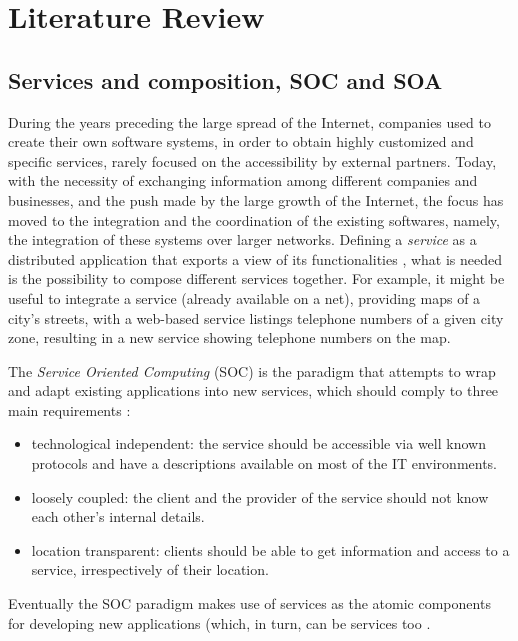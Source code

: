 \section{Literature Review}
\label{LiteratureReview}

\subsection{Services and composition, SOC and SOA}
\label{SOC&SOA}
During the years preceding the large spread of the Internet, companies used to create their own software systems, in order to obtain highly customized and specific services, rarely focused on the accessibility by external partners.
Today, with the necessity of exchanging information among different companies and businesses, and the push made by the large growth of the Internet, the focus has moved to the integration and the coordination of the existing softwares, namely, the integration of these systems over larger networks.
Defining a \textit{service} as a distributed application that exports a view of its functionalities  \cite{DiLorenzo08}, what is needed is the possibility to compose different services together.
For example, it might be useful to integrate a service (already available on a net), providing maps of a city's streets, with a web-based service listings telephone numbers of a given city zone, resulting in a new service showing telephone numbers on the map. %
  
The \textit{Service Oriented Computing} (SOC) is the paradigm that attempts to wrap and adapt existing applications into new services, which should comply to three main requirements \cite{DiLorenzo08,Papazoglou03}:
\begin{itemize}
 \item technological independent: the service should be accessible via well known protocols and have a descriptions available on most of the IT environments.
 \item loosely coupled: the client and the provider of the service should not know each other's internal details.
 \item location transparent: clients should be able to get information and access to a service, irrespectively of their location. 
\end{itemize}
Eventually the SOC paradigm makes use of services as the atomic components for developing new applications (which, in turn, can be services too \cite{Papazoglou03}.


